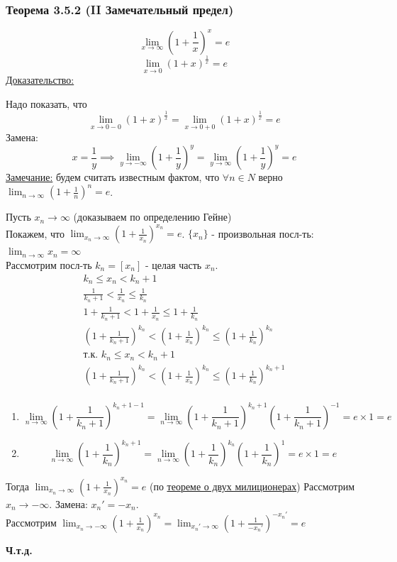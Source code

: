 \documentclass[12pt]{article}
\def\posl#1#2{\{#1_{#2}\}}
\begin{document}
    \subsubsection*{Теорема 3.5.2 (II Замечательный предел)}\label{th:3.5.2}
    \[ \lim_{x\to\infty}(1 + \frac{1}{x})^x = e \]
    \[ \lim_{x\to 0}(1 + x)^{\frac{1}{x}} = e \]\noindent
    \underline{Доказательство:}
    \begin{adjustwidth}{1.5em}{1.5em}
        Надо показать, что \[\lim_{x\to 0-0} (1 + x)^{\frac{1}{x}} = \lim_{x\to 0+0}(1+x)^{\frac{1}{x}} = e\]
        Замена: \[x = \frac{1}{y} \implies \lim_{y\to -\infty}(1 + \frac{1}{y})^y = \lim_{y\to\infty}(1 + \frac{1}{y})^y = e\]
        \underline{Замечание:} будем считать известным фактом, что $\forall n \in N$ верно $\lim_{n\to\infty}(1+\frac{1}{n})^n = e$.\par\noindent
        Пусть $x_n \to \infty$ (доказываем по определению Гейне)\\
        Покажем, что $\lim_{x_n\to\infty}(1 + \frac{1}{x_n})^{x_n} = e$. $\posl{x}{n}$ - произвольная посл-ть: $\lim_{n\to\infty}x_n = \infty$\\
        Рассмотрим посл-ть $k_n = [x_n]$ - целая часть $x_n$.\\
        \begin{gather*}
            k_n \le x_n < k_n + 1\\
            \frac{1}{k_n + 1} < \frac{1}{x_n} \le \frac{1}{k_n}\\
            1 + \frac{1}{k_n + 1} < 1 + \frac{1}{x_n} \le 1 + \frac{1}{k_n}\\
            (1 + \frac{1}{k_n + 1})^{k_n} < (1 + \frac{1}{x_n})^{k_n} \le (1 + \frac{1}{k_n})^{k_n}\\
            \text{т.к. } k_n \le x_n < k_n + 1\\
            (1 + \frac{1}{k_n + 1})^{k_n} < (1 + \frac{1}{x_n})^{k_n} \le (1 + \frac{1}{k_n})^{k_n+1}\\
        \end{gather*}
        \begin{enumerate}
            \item \[\lim_{n\to\infty}(1+\frac{1}{k_n+1})^{k_n+1-1} = \lim_{n\to\infty}(1+\frac{1}{k_n+1})^{k_n+1}(1+\frac{1}{k_n+1})^{-1} = e \times 1 = e\]
            \item \[\lim_{n\to\infty}(1+\frac{1}{k_n})^{k_n+1} = \lim_{n\to\infty}(1+\frac{1}{k_n})^{k_n}(1+\frac{1}{k_n})^{1} = e \times 1 = e\]
        \end{enumerate}
        Тогда $\lim_{x_n \to \infty}(1 + \frac{1}{x_n})^{x_n} = e$ (по \hyperref[th:2.2.5]{теореме о двух милиционерах})
        Рассмотрим $x_n \to -\infty$. Замена: $x_n' = -x_n$.\\
        Рассмотрим $\lim_{x_n \to -\infty}(1+\frac{1}{x_n})^{x_n} = \lim_{x_n'\to\infty}(1 + \frac{1}{-x_n'})^{-x_n'} = e$\\
        \begin{center}
            \textbf{Ч.т.д.}
        \end{center}
    \end{adjustwidth}
\end{document}
